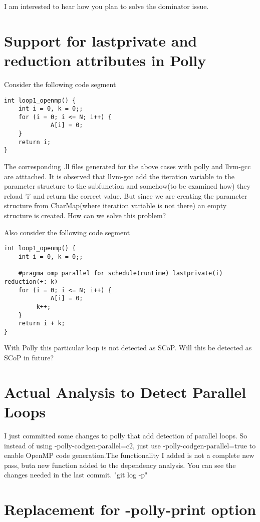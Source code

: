 \documentclass[a4paper,10pt]{article}
\begin{document}
I am interested to hear how you plan to solve the dominator issue.

\section{Support for lastprivate and reduction attributes in Polly}

Consider the following code segment

\begin{verbatim}
int loop1_openmp() {
    int i = 0, k = 0;;
    for (i = 0; i <= N; i++) {
             A[i] = 0;
    }
    return i;
}
\end{verbatim}


The corresponding .ll files generated for the above cases with polly and llvm-gcc are atttached. It is observed that llvm-gcc add the iteration variable to the parameter structure to the subfunction and somehow(to be examined how) they reload 'i' and return the correct value. But since we are creating the parameter structure from CharMap(where iteration variable is not there) an empty structure is created. How can we solve this problem?

Also consider the following code segment

\begin{verbatim}
int loop1_openmp() {
    int i = 0, k = 0;;

    #pragma omp parallel for schedule(runtime) lastprivate(i) reduction(+: k)
    for (i = 0; i <= N; i++) {
             A[i] = 0;
	     k++;
    }
    return i + k;
}
\end{verbatim}

With Polly this particular loop is not detected as SCoP. Will this be detected as SCoP in future?

\section{Actual Analysis to Detect Parallel Loops}

I just committed some changes to polly that add detection of parallel loops. So instead of using -polly-codgen-parallel=c2, just use -polly-codgen-parallel=true to enable OpenMP code generation.The functionality I added is not a complete new pass, buta new function added to the dependency analysis. You can see the changes needed in the last commit. "git log -p"



\section{Replacement for -polly-print option}
\end{document}
